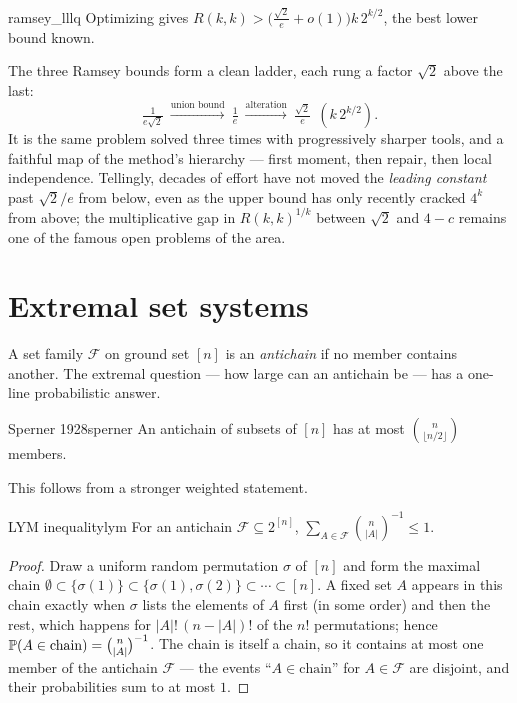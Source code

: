 \begin{remark}{}{ramsey_lllq}
Optimizing gives $R(k,k)>\bigl(\tfrac{\sqrt2}{e}+o(1)\bigr)k\,2^{k/2}$, the best
lower bound known.
\end{remark}

\begin{insight}
The three Ramsey bounds form a clean ladder, each rung a factor $\sqrt2$ above
the last:
\[
  \tfrac{1}{e\sqrt2}\ \xrightarrow{\text{union bound}}\
  \tfrac{1}{e}\ \xrightarrow{\text{alteration}}\
  \tfrac{\sqrt2}{e}\ \ (k\,2^{k/2}).
\]
It is the same problem solved three times with progressively sharper tools, and
a faithful map of the method's hierarchy --- first moment, then repair, then
local independence. Tellingly, decades of effort have not moved the
\emph{leading constant} past $\sqrt2/e$ from below, even as the upper bound has
only recently cracked $4^k$ from above; the multiplicative gap in
$R(k,k)^{1/k}$ between $\sqrt2$ and $4-c$ remains one of the famous open
problems of the area.
\end{insight}

\section{Extremal set systems}

A set family $\mathcal F$ on ground set $[n]$ is an \emph{antichain} if no
member contains another. The extremal question --- how large can an antichain
be --- has a one-line probabilistic answer.

\begin{theorem}{Sperner 1928}{sperner}
An antichain of subsets of $[n]$ has at most $\binom{n}{\lfloor n/2\rfloor}$
members.
\end{theorem}

This follows from a stronger weighted statement.

\begin{theorem}{LYM inequality}{lym}
For an antichain $\mathcal F\subseteq 2^{[n]}$,
$\displaystyle\sum_{A\in\mathcal F}\binom{n}{|A|}^{-1}\le 1.$
\end{theorem}

\begin{proof}
Draw a uniform random permutation $\sigma$ of $[n]$ and form the maximal chain
$\emptyset\subset\{\sigma(1)\}\subset\{\sigma(1),\sigma(2)\}\subset\cdots\subset[n]$.
A fixed set $A$ appears in this chain exactly when $\sigma$ lists the elements
of $A$ first (in some order) and then the rest, which happens for
$|A|!\,(n-|A|)!$ of the $n!$ permutations; hence
$\mathbb{P}(A\in\text{chain})=\binom{n}{|A|}^{-1}$. The chain is itself a chain, so
it contains at most one member of the antichain $\mathcal F$ --- the events
``$A\in\text{chain}$'' for $A\in\mathcal F$ are disjoint, and their
probabilities sum to at most $1$.
\end{proof}

